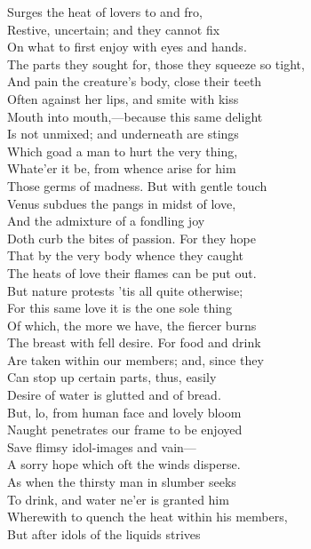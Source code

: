Surges the heat of lovers to and fro,\\
Restive, uncertain; and they cannot fix\\
On what to first enjoy with eyes and hands.\\
The parts they sought for, those they squeeze so tight,\\
And pain the creature's body, close their teeth\\
Often against her lips, and smite with kiss\\
Mouth into mouth,—because this same delight\\
Is not unmixed; and underneath are stings\\
Which goad a man to hurt the very thing,\\
Whate'er it be, from whence arise for him\\
Those germs of madness. But with gentle touch\\
Venus subdues the pangs in midst of love,\\
And the admixture of a fondling joy\\
Doth curb the bites of passion. For they hope\\
That by the very body whence they caught\\
The heats of love their flames can be put out.\\
But nature protests 'tis all quite otherwise;\\
For this same love it is the one sole thing\\
Of which, the more we have, the fiercer burns\\
The breast with fell desire. For food and drink\\
Are taken within our members; and, since they\\
Can stop up certain parts, thus, easily\\
Desire of water is glutted and of bread.\\
But, lo, from human face and lovely bloom\\
Naught penetrates our frame to be enjoyed\\
Save flimsy idol-images and vain—\\
A sorry hope which oft the winds disperse.\\
As when the thirsty man in slumber seeks\\
To drink, and water ne'er is granted him\\
Wherewith to quench the heat within his members,\\
But after idols of the liquids strives\\
